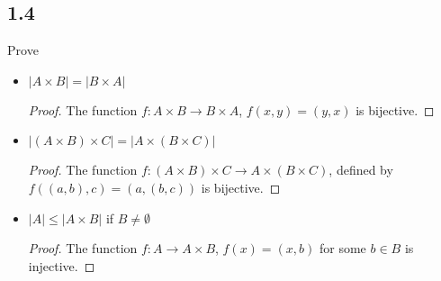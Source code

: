 \subsection*{1.4} Prove

\begin{itemize}
    \item $|A \times B| = |B \times A|$
    
    \begin{proof}
    The function $f: A \times B \rightarrow B \times A$, $f(x,y) = (y,x)$ is bijective.
    \end{proof}
    
    \item $|(A \times B) \times C| = |A \times (B \times C)|$
    
    \begin{proof}
    The function $f: (A \times B) \times C \rightarrow A \times (B \times C)$, defined by $f((a,b), c) = (a, (b,c))$ is bijective.
    \end{proof}
    
    \item $|A| \leq |A \times B|$ if $B \neq \emptyset$
    
    \begin{proof}
    The function $f: A \rightarrow A \times B$, $f(x) = (x,b)$ for some $b \in B$ is injective.
    \end{proof}
\end{itemize}

